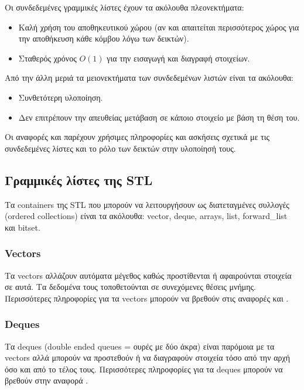






Οι συνδεδεμένες γραμμικές λίστες έχουν τα ακόλουθα πλεονεκτήματα:
\begin{itemize}[nolistsep]
\item Καλή χρήση του αποθηκευτικού χώρου (αν και απαιτείται περισσότερος χώρος για την αποθήκευση κάθε κόμβου λόγω των δεικτών). 
\item Σταθερός χρόνος $O(1)$ για την εισαγωγή και διαγραφή στοιχείων.
\end{itemize}
Από την άλλη μεριά τα μειονεκτήματα των συνδεδεμένων λιστών είναι τα ακόλουθα:
\begin{itemize}[nolistsep]
\item Συνθετότερη υλοποίηση.
\item Δεν επιτρέπουν την απευθείας μετάβαση σε κάποιο στοιχείο με βάση τη θέση του.
\end{itemize}

Οι αναφορές \cite{csstanford103} και \cite{csstanford105} παρέχουν χρήσιμες πληροφορίες και ασκήσεις σχετικά με τις συνδεδεμένες λίστες και το ρόλο των δεικτών στην υλοποίησή τους.

\subsection{Γραμμικές λίστες της STL}
Τα containers της STL που μπορούν να λειτουργήσουν ως διατεταγμένες συλλογές (ordered collections) είναι τα ακόλουθα: vector, deque, arrays, list, forward\_list και bitset. 

\subsubsection{Vectors}
Τα vectors αλλάζουν αυτόματα μέγεθος καθώς προστίθενται ή αφαιρούνται στοιχεία σε αυτά. Τα δεδομένα τους τοποθετούνται σε συνεχόμενες θέσεις μνήμης. Περισσότερες πληροφορίες για τα vectors μπορούν να βρεθούν στις αναφορές \cite{g4gvector} και \cite{codecogsvector}.

\subsubsection{Deques}
Τα deques (double ended queues = ουρές με δύο άκρα) είναι παρόμοια με τα vectors αλλά μπορούν να προστεθούν ή να διαγραφούν στοιχεία τόσο από την αρχή όσο και από το τέλος τους. Περισσότερες πληροφορίες για τα deques μπορούν να βρεθούν στην αναφορά \cite{g4gdeque}.

